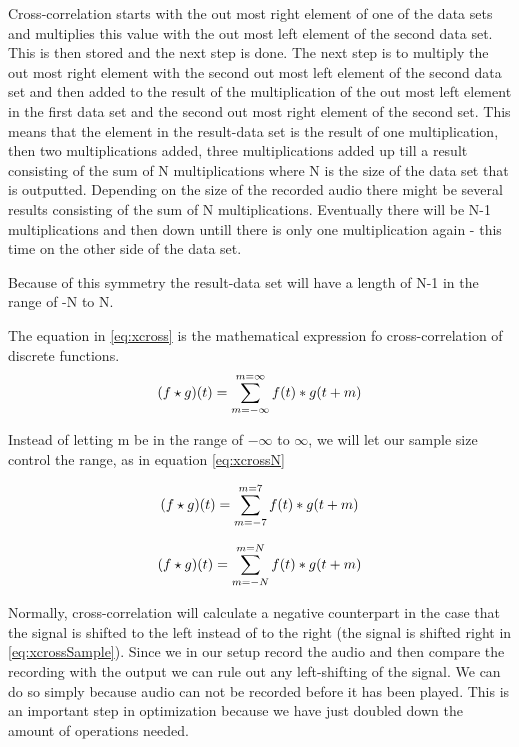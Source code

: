 Cross-correlation starts with the out most right element of one of the data sets and multiplies this value with the out most left element of the second data set. This is then stored and the next step is done. The next step is to multiply the out most right element with the second out most left element of the second data set and then added to the result of the multiplication of the out most left element in the first data set and the second out most right element of the second set. This means that the element in the result-data set is the result of one multiplication, then two multiplications added, three multiplications added up till a result consisting of the sum of N multiplications where N is the size of the data set that is outputted. Depending on the size of the recorded audio there might be several results consisting of the sum of N multiplications. Eventually there will be N-1 multiplications and then down untill there is only one multiplication again - this time on the other side of the data set.

Because of this symmetry the result-data set will have a length of N-1 in the range of -N to N.

The equation in \ref{eq:xcross} is the mathematical expression fo cross-correlation of discrete functions.
\begin{equation}
\label{eq:xcross}
\centering
(f\star g)(t)=\sum\limits_{m=-\infty}^{m=\infty}f(t)*g(t+m)
\end{equation}

Instead of letting m be in the range of $-\infty$ to $\infty$, we will let our sample size control the range, as in equation \ref{eq:xcrossN}

\begin{equation}
\label{eq:xcross2}
\centering
(f\star g)(t)=\sum\limits_{m=-7}^{m=7}f(t)*g(t+m)
\end{equation}

\begin{equation}
\label{eq:xcrossN}
\centering
(f\star g)(t)=\sum\limits_{m=-N}^{m=N}f(t)*g(t+m)
\end{equation}

Normally, cross-correlation will calculate a negative counterpart in the case that the signal is shifted to the left instead of to the right (the signal is shifted right in \ref{eq:xcrossSample}). Since we in our setup record the audio and then compare the recording with the output we can rule out any left-shifting of the signal. We can do so simply because audio can not be recorded before it has been played. This is an important step in optimization because we have just doubled down the amount of operations needed.

